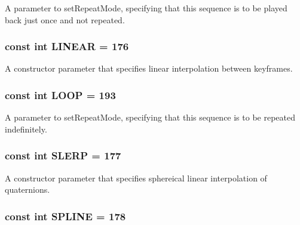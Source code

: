 A parameter to setRepeatMode, specifying that this sequence is to be played back just once and not repeated. \hypertarget{classm3g_1_1KeyframeSequence_23ccf193c67257f1be26417041cecb31}{
\subsubsection[{LINEAR}]{\setlength{\rightskip}{0pt plus 5cm}const int {\bf LINEAR} = 176}}
\label{classm3g_1_1KeyframeSequence_23ccf193c67257f1be26417041cecb31}


A constructor parameter that specifies linear interpolation between keyframes. \hypertarget{classm3g_1_1KeyframeSequence_ecc439231d4f3639e6f6a9625615a0f7}{
\subsubsection[{LOOP}]{\setlength{\rightskip}{0pt plus 5cm}const int {\bf LOOP} = 193}}
\label{classm3g_1_1KeyframeSequence_ecc439231d4f3639e6f6a9625615a0f7}


A parameter to setRepeatMode, specifying that this sequence is to be repeated indefinitely. \hypertarget{classm3g_1_1KeyframeSequence_77ebb943765f530d2883e1c26127d3ce}{
\subsubsection[{SLERP}]{\setlength{\rightskip}{0pt plus 5cm}const int {\bf SLERP} = 177}}
\label{classm3g_1_1KeyframeSequence_77ebb943765f530d2883e1c26127d3ce}


A constructor parameter that specifies sphereical linear interpolation of quaternions. \hypertarget{classm3g_1_1KeyframeSequence_fbb002ac924c1349dead17c16b6fa720}{
\subsubsection[{SPLINE}]{\setlength{\rightskip}{0pt plus 5cm}const int {\bf SPLINE} = 178}}
\label{classm3g_1_1KeyframeSequence_fbb002ac924c1349dead17c16b6fa720}


